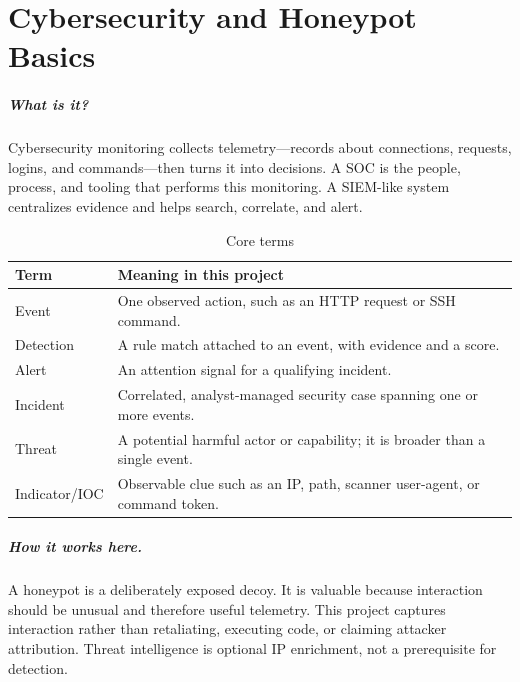 \documentclass[11pt,oneside]{book}
\newcommand{\what}[1]{\paragraph{What is it?}#1}
\newcommand{\how}[1]{\paragraph{How it works here.}#1}
\begin{document}
\chapter{Cybersecurity and Honeypot Basics}
\what{Cybersecurity monitoring collects telemetry---records about connections, requests, logins, and commands---then turns it into decisions. A SOC is the people, process, and tooling that performs this monitoring. A SIEM-like system centralizes evidence and helps search, correlate, and alert.}
\begin{table}[h]\centering\caption{Core terms}\begin{tabularx}{\linewidth}{lX}\toprule Term & Meaning in this project\\\midrule
Event & One observed action, such as an HTTP request or SSH command.\\
Detection & A rule match attached to an event, with evidence and a score.\\
Alert & An attention signal for a qualifying incident.\\
Incident & Correlated, analyst-managed security case spanning one or more events.\\
Threat & A potential harmful actor or capability; it is broader than a single event.\\
Indicator/IOC & Observable clue such as an IP, path, scanner user-agent, or command token.\\\bottomrule\end{tabularx}\end{table}
\how{A honeypot is a deliberately exposed decoy. It is valuable because interaction should be unusual and therefore useful telemetry. This project captures interaction rather than retaliating, executing code, or claiming attacker attribution. Threat intelligence is optional IP enrichment, not a prerequisite for detection.}
\end{document}
